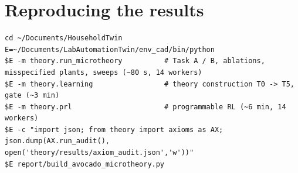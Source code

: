 \documentclass[10.5pt,a4paper]{article}
\begin{document}
\appendix
\section{Reproducing the results}
\par\begin{Verbatim}[fontsize=\scriptsize,frame=lines,framesep=2mm,breaklines]
cd ~/Documents/HouseholdTwin
E=~/Documents/LabAutomationTwin/env_cad/bin/python
$E -m theory.run_microtheory          # Task A / B, ablations, misspecified plants, sweeps (~80 s, 14 workers)
$E -m theory.learning                 # theory construction T0 -> T5, gate (~3 min)
$E -m theory.prl                      # programmable RL (~6 min, 14 workers)
$E -c "import json; from theory import axioms as AX; json.dump(AX.run_audit(), open('theory/results/axiom_audit.json','w'))"
$E report/build_avocado_microtheory.py
\end{Verbatim}
\end{document}
